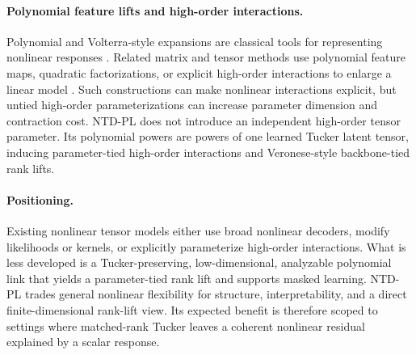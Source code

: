 \paragraph{Polynomial feature lifts and high-order interactions.}
Polynomial and Volterra-style expansions are classical tools for representing
nonlinear responses \citep{Volterra1959Theory,Boyd1985FadingMemory}. Related
matrix and tensor methods use polynomial feature maps, quadratic
factorizations, or explicit high-order interactions to enlarge a linear model
\citep{zhai2024quadratic,Ruegamer2024AISTATS,liu2015model,deng2016storm}.
Such constructions can make nonlinear interactions explicit, but untied
high-order parameterizations can increase parameter dimension and contraction
cost. NTD-PL does not introduce an independent high-order tensor parameter. Its
polynomial powers are powers of one learned Tucker latent tensor, inducing
parameter-tied high-order interactions and Veronese-style backbone-tied rank
lifts.

\paragraph{Positioning.}
Existing nonlinear tensor models either use broad nonlinear decoders, modify
likelihoods or kernels, or explicitly parameterize high-order interactions.
What is less developed is a Tucker-preserving, low-dimensional, analyzable
polynomial link that yields a parameter-tied rank lift and supports
masked learning. NTD-PL trades general nonlinear flexibility for structure,
interpretability, and a direct finite-dimensional rank-lift view. Its expected
benefit is therefore scoped to settings where matched-rank Tucker leaves a
coherent nonlinear residual explained by a scalar response.
